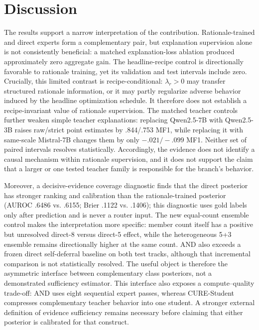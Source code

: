 \documentclass[11pt]{article}
\begin{document}
\section{Discussion}
The results support a narrow interpretation of the contribution. Rationale-trained and direct experts form a complementary pair, but explanation supervision alone is not consistently beneficial: a matched explanation-loss ablation produced approximately zero aggregate gain. The headline-recipe control is directionally favorable to rationale training, yet its validation and test intervals include zero. Crucially, this limited contrast is recipe-conditional: $\lambda_r>0$ may transfer structured rationale information, or it may partly regularize adverse behavior induced by the headline optimization schedule. It therefore does not establish a recipe-invariant value of rationale supervision. The matched teacher controls further weaken simple teacher explanations: replacing Qwen2.5-7B with Qwen2.5-3B raises raw/strict point estimates by .844/.753 MF1, while replacing it with same-scale Mistral-7B changes them by only $-.021/-.099$ MF1. Neither set of paired intervals resolves statistically. Accordingly, the evidence does not identify a causal mechanism within rationale supervision, and it does not support the claim that a larger or one tested teacher family is responsible for the branch's behavior.

Moreover, a decisive-evidence coverage diagnostic finds that the direct posterior has stronger ranking and calibration than the rationale-trained posterior (AUROC .6486 vs. .6155; Brier .1122 vs. .1406); this diagnostic uses gold labels only after prediction and is never a router input. The new equal-count ensemble control makes the interpretation more specific: member count itself has a positive but unresolved direct-8 versus direct-5 effect, while the heterogeneous 5+3 ensemble remains directionally higher at the same count. AND also exceeds a frozen direct self-deferral baseline on both test tracks, although that incremental comparison is not statistically resolved. The useful object is therefore the asymmetric interface between complementary class posteriors, not a demonstrated sufficiency estimator. This interface also exposes a compute--quality trade-off: AND uses eight sequential expert passes, whereas \textsc{CURE}-Student compresses complementary teacher behavior into one student. A stronger external definition of evidence sufficiency remains necessary before claiming that either posterior is calibrated for that construct.
\end{document}
